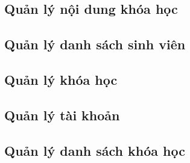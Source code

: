 \documentclass[./../main_file.tex]{subfiles}
\begin{document}
\subsection{Quản lý nội dung khóa học}
\subsection{Quản lý danh sách sinh viên}
\subsection{Quản lý khóa học}
\subsection{Quản lý tài khoản}
\subsection{Quản lý danh sách khóa học}
\end{document}
